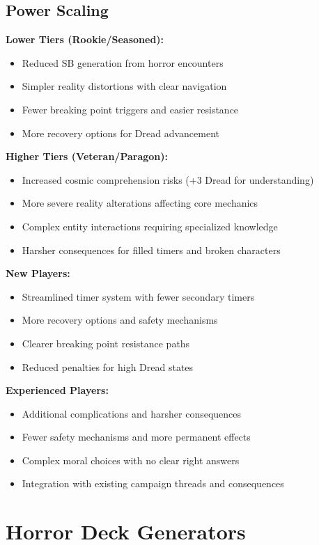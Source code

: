 \documentclass[11pt]{article}
\begin{document}
\subsection{Power Scaling}

\textbf{Lower Tiers (Rookie/Seasoned):}
\begin{itemize}
\item Reduced SB generation from horror encounters
\item Simpler reality distortions with clear navigation
\item Fewer breaking point triggers and easier resistance
\item More recovery options for Dread advancement
\end{itemize}

\textbf{Higher Tiers (Veteran/Paragon):}
\begin{itemize}
\item Increased cosmic comprehension risks (+3 Dread for understanding)
\item More severe reality alterations affecting core mechanics
\item Complex entity interactions requiring specialized knowledge
\item Harsher consequences for filled timers and broken characters
\end{itemize}

\textbf{New Players:}
\begin{itemize}
\item Streamlined timer system with fewer secondary timers
\item More recovery options and safety mechanisms
\item Clearer breaking point resistance paths
\item Reduced penalties for high Dread states
\end{itemize}

\textbf{Experienced Players:}
\begin{itemize}
\item Additional complications and harsher consequences
\item Fewer safety mechanisms and more permanent effects
\item Complex moral choices with no clear right answers
\item Integration with existing campaign threads and consequences
\end{itemize}

\section{Horror Deck Generators}
\end{document}
